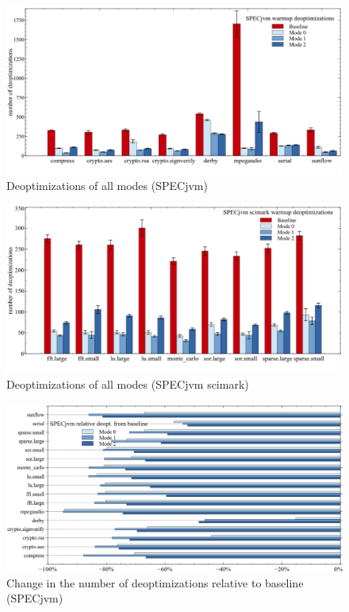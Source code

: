 \begin{figure}[ht]
  \begin{center}
    \centering
    \includegraphics[width=1.0\textwidth]{figures/others_warmup_deopt.png}
    \caption{Deoptimizations of all modes (SPECjvm)}
    \label{f:others_warmup_deopt}
  \end{center}
\end{figure}
\begin{figure}[ht]
  \begin{center}
    \centering
    \includegraphics[width=1.0\textwidth]{figures/scimark_warmup_deopt.png}
    \caption{Deoptimizations of all modes (SPECjvm scimark)}
    \label{f:scimark_warmup_deopt}
  \end{center}
\end{figure}
\begin{figure}[ht]
  \begin{center}
    \centering
    \includegraphics[width=1.0\textwidth]{figures/all_warmup_variation_deopt.png}
    \caption{Change in the number of deoptimizations relative to baseline (SPECjvm)}
    \label{f:all_warmup_variation_deopt}
  \end{center}
\end{figure}
